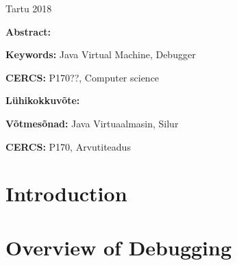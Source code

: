 \documentclass{style/bachelor-thesis}
\begin{document}
\vfill
\centerline{Tartu 2018}


\pagebreak
\listoftodos[Todos]

\pagebreak

\noindent\textbf{\large \articleName}
\vspace*{3ex}
\begin{flushleft}
  \textbf{Abstract:} %
\end{flushleft}


\vspace*{3ex}
\begin{flushleft}
  \textbf{Keywords:} Java Virtual Machine, Debugger
\end{flushleft}
\vspace*{3ex}

\noindent\textbf{CERCS:} P170??, Computer science

\vspace*{5ex}
\noindent\textbf{\large \articleNameEE}
\vspace*{3ex}

\begin{flushleft}
  \textbf{Lühikokkuvõte:} %
\end{flushleft}
\vspace*{3ex}

\begin{flushleft}
  \textbf{Võtmesõnad:} Java Virtuaalmasin, Silur 
\end{flushleft}
\vspace*{3ex}

\noindent\textbf{CERCS:} P170, Arvutiteadus

\newpage




\tableofcontents

\pagebreak


\section{Introduction}


\pagebreak

\section{Overview of Debugging}
\label{sec:debugging}

\end{document}
